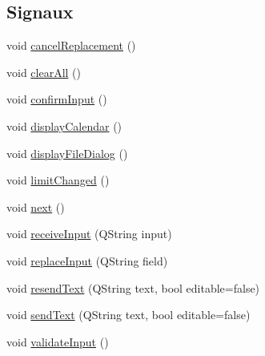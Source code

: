 \subsection*{Signaux}
\begin{DoxyCompactItemize}
\item 
void \hyperlink{classSH__InOutStateMachine_a67ce246a765ad91fef76f70ece12213f}{cancel\-Replacement} ()
\item 
void \hyperlink{classSH__InOutStateMachine_ad722deb53285919796b04db5af6e51b4}{clear\-All} ()
\item 
void \hyperlink{classSH__InOutStateMachine_a0fb4c4d63ccb19df48f1e060d02d8ae3}{confirm\-Input} ()
\item 
void \hyperlink{classSH__InOutStateMachine_a0d241868828cbf9798233a8c74c69851}{display\-Calendar} ()
\item 
void \hyperlink{classSH__InOutStateMachine_aeddfbc098f5ee8ac05eadbaf37803fb1}{display\-File\-Dialog} ()
\item 
void \hyperlink{classSh__LoopingInOutStateMachine_a5b65ad7a49294022ff781c71c4702157}{limit\-Changed} ()
\item 
void \hyperlink{classSH__InOutStateMachine_aa9ee51efe0e17dcf5366c8a97b523892}{next} ()
\item 
void \hyperlink{classSH__InOutStateMachine_ab224e4a6ab99c15770bc63e1b8fdb771}{receive\-Input} (Q\-String input)
\item 
void \hyperlink{classSH__InOutStateMachine_af5f82970faef3bca48a147863dba2ee1}{replace\-Input} (Q\-String field)
\item 
void \hyperlink{classSH__InOutStateMachine_a526822c66b46aa0cd81ba4473fa5573f}{resend\-Text} (Q\-String text, bool editable=false)
\item 
void \hyperlink{classSH__InOutStateMachine_ae2cbbe3cd207158668dcb4838938c7ad}{send\-Text} (Q\-String text, bool editable=false)
\item 
void \hyperlink{classSH__InOutStateMachine_a5a5804bd32a04d25926f6e323b906887}{validate\-Input} ()
\end{DoxyCompactItemize}
